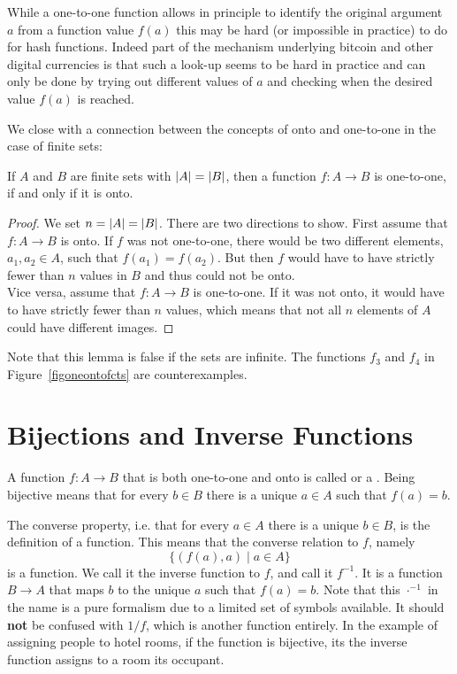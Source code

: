 While a one-to-one function allows in principle to identify the original
argument $a$ from a function value $f(a)$ this may be hard (or impossible in
practice) to do for hash functions. Indeed part of the mechanism underlying
bitcoin and other digital currencies is that such a look-up seems to be hard
in practice and can only be done by trying out different values of $a$ and
checking when the desired value $f(a)$ is reached.
\medskip

We close with a connection between the concepts of onto and one-to-one in
the case of finite sets:
\begin{lemma}
\label{lemoneonto}
If $A$ and $B$ are finite sets with $\left|A\right|=\left|B\right|$, then a function $f\colon A\to B$ is
one-to-one, if and only if it is onto.
\end{lemma}
\begin{proof}
We set $n=\left|A\right|=\left|B\right|$.
There are two directions to show. First assume that $f\colon A\to B$ is onto. If $f$ was
not one-to-one, there would be two different elements, $a_1,a_2\in A$, such that
$f(a_1)=f(a_2)$. But then $f$ would have to have strictly fewer than $n$ values in $B$
and thus could not be onto.\\
Vice versa, assume that $f\colon A\to B$ is one-to-one. If it was not onto, it would
have to have strictly fewer than $n$ values, which means that not all $n$ elements of
$A$ could have different images.
\end{proof}
Note that this lemma is false if the sets are infinite. The functions $f_3$ and $f_4$ in
Figure~\ref{figoneontofcts} are counterexamples.

\section{Bijections and Inverse Functions}

A function $f\colon A\to B$ that is both one-to-one and onto is called
 or a . Being bijective means that for every $b\in
B$ there is a unique $a\in A$ such that $f(a)=b$.

The converse property, i.e. that for every
$a\in A$ there is a unique $b\in B$, is the definition of a function. This means that
the converse relation to $f$, namely
\[
\{(f(a),a)\mid a\in A\}
\]
is a function. We call it the inverse function to $f$, and call it $f^{-1}$. It is a
function $B\to A$ that maps $b$ to the unique $a$ such that $f(a)=b$.
Note that
this $\cdot^{-1}$ in the name is a pure formalism due to a limited set of symbols available. It
should \textbf{not} be confused with $1/f$, which is another function entirely.
In the example of assigning people to hotel rooms, if the function is bijective, its the
inverse function assigns to a room its occupant.

